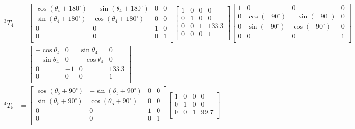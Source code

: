 \documentclass[UTF8, 13pt]{ctexart}
\begin{document}
\[
\begin{aligned}
{}^3T_4 &= \begin{bmatrix}
        \cos(\theta_4 + 180^\circ) & -\sin(\theta_4 + 180^\circ) & 0 & 0 \\
        \sin(\theta_4 + 180^\circ) & \cos(\theta_4 + 180^\circ) & 0 & 0 \\
        0 & 0 & 1 & 0 \\
        0 & 0 & 0 & 1 \\
        \end{bmatrix}
        \begin{bmatrix}
        1 & 0 & 0 & 0 \\
        0 & 1 & 0 & 0 \\
        0 & 0 & 1 & 133.3 \\
        0 & 0 & 0 & 1 \\
        \end{bmatrix}
        \begin{bmatrix}
        1 & 0 & 0 & 0 \\
        0 & \cos(-90^\circ) & -\sin(-90^\circ) & 0 \\
        0 & \sin(-90^\circ) & \cos(-90^\circ) & 0 \\
        0 & 0 & 0 & 1 \\
        \end{bmatrix} \\
        &= \begin{bmatrix}
        -\cos\theta_4 & 0 & \sin\theta_4 & 0 \\
        -\sin\theta_4 & 0 & -\cos\theta_4 & 0 \\
        0 & -1 & 0 & 133.3 \\
        0 & 0 & 0 & 1 \\
        \end{bmatrix} \\
{}^4T_5 &= \begin{bmatrix}
        \cos(\theta_5 + 90^\circ) & -\sin(\theta_5 + 90^\circ) & 0 & 0 \\
        \sin(\theta_5 + 90^\circ) & \cos(\theta_5 + 90^\circ) & 0 & 0 \\
        0 & 0 & 1 & 0 \\
        0 & 0 & 0 & 1 \\
        \end{bmatrix}
        \begin{bmatrix}
        1 & 0 & 0 & 0 \\
        0 & 1 & 0 & 0 \\
        0 & 0 & 1 & 99.7 \\

\end{bmatrix}
\end{aligned}\]
\end{document}
